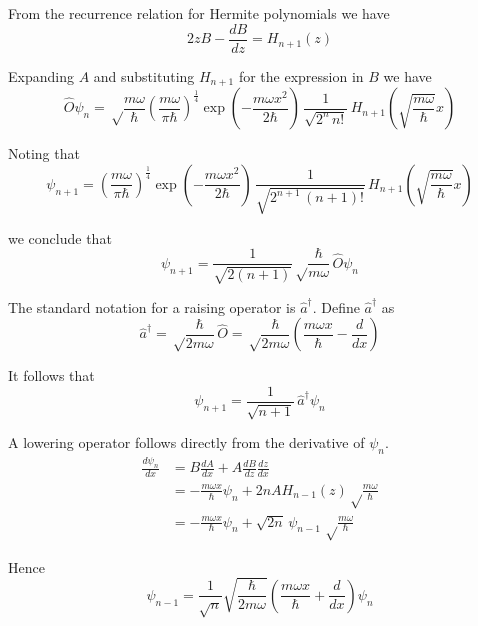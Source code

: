 \documentclass[12pt]{article}
\begin{document}
\noindent
From the recurrence relation for Hermite polynomials we have
\begin{equation*}
2zB-\frac{dB}{dz}=H_{n+1}(z)
\end{equation*}

\noindent
Expanding $A$ and substituting $H_{n+1}$ for the expression in $B$ we have
\begin{equation*}
\hat{O}\psi_n=\sqrt\frac{m\omega}{\hbar}
\left(\frac{m\omega}{\pi\hbar}\right)^\frac{1}{4}
\exp\left(-\frac{m\omega x^2}{2\hbar}\right)\,\frac{1}{\sqrt{2^n\,n!}}
\,H_{n+1}\left(\sqrt{\frac{m\omega}{\hbar}} x\right)
\end{equation*}

\noindent
Noting that
\begin{equation*}
\psi_{n+1}=
\left(\frac{m\omega}{\pi\hbar}\right)^\frac{1}{4}
\exp\left(-\frac{m\omega x^2}{2\hbar}\right)\,\frac{1}{\sqrt{2^{n+1}\,(n+1)!}}
\,H_{n+1}\left(\sqrt{\frac{m\omega}{\hbar}} x\right)
\end{equation*}

\noindent
we conclude that
\begin{equation*}
\psi_{n+1}=\frac{1}{\sqrt{2(n+1)}}
\sqrt\frac{\hbar}{m\omega}\,\hat{O}\psi_n
\end{equation*}

\noindent
The standard notation for a raising operator is $\hat{a}^\dagger$.
Define $\hat{a}^\dagger$ as
\begin{equation*}
\hat{a}^\dagger
=\sqrt\frac{\hbar}{2m\omega}\,\hat{O}
=\sqrt\frac{\hbar}{2m\omega}\left(\frac{m\omega x}{\hbar}-\frac{d}{dx}\right)
\end{equation*}

\noindent
It follows that
\begin{equation*}
\psi_{n+1}=\frac{1}{\sqrt{n+1}}\,\hat{a}^\dagger\psi_n
\end{equation*}

\noindent
A lowering operator follows directly from the derivative of $\psi_n$.
\begin{align*}
\frac{d\psi_n}{dx}
&=B\frac{dA}{dx}+A\frac{dB}{dz}\frac{dz}{dx}
\\
&=-\frac{m\omega x}{\hbar}\psi_n+2nAH_{n-1}(z)\sqrt\frac{m\omega}{\hbar}
\\
&=-\frac{m\omega x}{\hbar}\psi_n+\sqrt{2n}\,\psi_{n-1}
\,\sqrt\frac{m\omega}{\hbar}
\end{align*}

\noindent
Hence
\begin{equation*}
\psi_{n-1}=\frac{1}{\sqrt{n}}\sqrt{\frac{\hbar}{2m\omega}}\left(\frac{m\omega x}{\hbar}+\frac{d}{dx}\right)\psi_n
\end{equation*}
\end{document}
